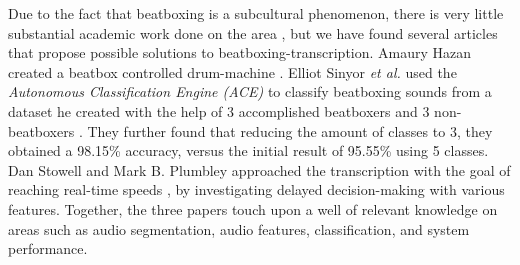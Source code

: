 


Due to the fact that beatboxing is a subcultural phenomenon, there is very little substantial academic work done on the area \citep{Stowell2008}, but we have found several articles that propose possible solutions to beatboxing-transcription. Amaury Hazan created a beatbox controlled drum-machine \citep{Hazan2005}. Elliot Sinyor \textit{et al.} used the \textit{Autonomous Classification Engine (ACE)} to classify beatboxing sounds from a dataset he created with the help of 3 accomplished beatboxers and 3 non-beatboxers \citep{Sinyor05}. They further found that reducing the amount of classes to 3, they obtained a 98.15\% accuracy, versus the initial result of 95.55\% using 5 classes. Dan Stowell and Mark B. Plumbley approached the transcription with the goal of reaching real-time speeds \citep{Stowell2008}, by investigating delayed decision-making with various features. Together, the three papers touch upon a well of relevant knowledge on areas such as audio segmentation, audio features, classification, and system performance.


